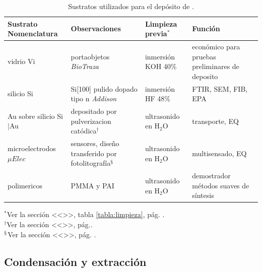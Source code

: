 		 	      \begin{table}[ht]
		  		  \caption[Sustratos utilizados para el depósito de \pdm]{Sustratos utilizados para el depósito de \pdm.} 
		  		  \begin{tabular}{>{\raggedright\arraybackslash}m{2.4cm}>{\raggedright\arraybackslash}m{2.5cm}>{\raggedright\arraybackslash}m{2cm}>{\raggedright\arraybackslash}m{3.55cm}} 
		  		  \toprule
				  Sustrato Nomenclatura   & Observaciones  & Limpieza previa$^*$ & Función \\ \midrule
		       	  vidrio \hspace{2cm} Vi  &	portaobjetos \textit{BioTraza} & inmersión KOH 40\% & económico para pruebas preliminares de deposito \\ \midrule
		       	  silicio\hspace{2cm} Si  & Si[100] pulido dopado tipo n  \textit{Addison}& inmersión HF 48\% & FTIR, SEM, FIB, EPA \\ \midrule
		       	  Au sobre silicio\hspace{2cm} Si$|$Au & depositado por pulverizacion catódica$^\dagger$  & ultrasonido en H$_2$O  & transporte, EQ\\ \midrule
		      	  microelectrodos \hspace{2cm} $\mu Elec$ & sensores, diseño transferido por fotolitografía$^\mathsection$  	  &  ultrasonido en H$_2$O  & multisensado, EQ \\ \midrule
		      	  polimericos         &  PMMA y PAI		  &  ultrasonido en H$_2$O &  demostrador métodos suaves de síntesis\\ 
		      	  \bottomrule
		    	  \end{tabular}\vspace*{2pt}
		    	  \footnotesize{$^*$Ver la sección <<>>, tabla \ref{tabla:limpieza}, pág. \pageref{sec:limpieza}.}\\
		    	  \footnotesize{$^\dagger$Ver la sección <<>>, pág.\pageref{sec:sputt}.} \\
		    	  \footnotesize{$^\mathsection$Ver la sección <<>>, pág. \pageref{sec:sputt}.}
		    	  \label{tabla:sustratos}
		   		  \end{table}
			
				  \pagebreak

	\subsection{Condensación y extracción}\label{sec:cond_y_extr}

